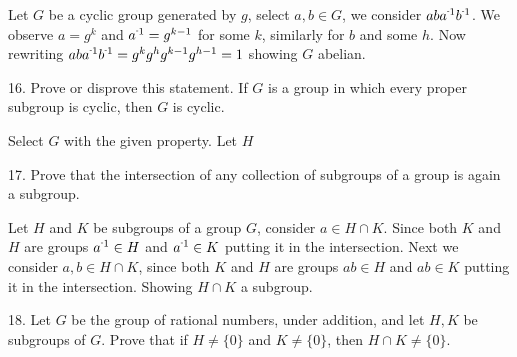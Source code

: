 \begin{mdframed}[style=darkAnswer,frametitle={Joe Starr}]
Let $G$ be a cyclic group generated by $g$, select $a,b\in G$, we consider
$ab\inv{a}\inv{b}$. We observe $a=g^k$ and $\inv{a}=g^{k-1}$ for some $k$,
similarly for $b$ and some $h$. Now rewriting
$ab\inv{a}\inv{b}=g^kg^hg^{k-1}g^{h-1}=1$ showing $G$ abelian.
\end{mdframed}
\newpage
\begin{mdframed}[style=darkQuesion]
16. Prove or disprove this statement. If $G$ is a group in which every proper subgroup is cyclic, then $G$ is cyclic.

\end{mdframed}

\begin{mdframed}[style=darkAnswer,frametitle={Joe Starr}]
Select $G$ with the given property. Let $H$

\end{mdframed}
\newpage
\begin{mdframed}[style=darkQuesion]
17. Prove that the intersection of any collection of subgroups of a group is again a subgroup.

\end{mdframed}

\begin{mdframed}[style=darkAnswer,frametitle={Joe Starr}]
Let $H$ and $K$ be subgroups of a group $G$, consider $a\in H\cap K$. Since
both $K$ and $H$ are groups $\inv{a} \in H$ and $\inv{a} \in K$ putting it in
the intersection. Next we consider $a,b\in H\cap K$, since
both $K$ and $H$ are groups $ab \in H$ and $ab \in K$ putting it in
the intersection. Showing $ H\cap K$ a subgroup.
\end{mdframed}
\newpage
\begin{mdframed}[style=darkQuesion]
18. Let $G$ be the group of rational numbers, under addition, and let $H, K$ be subgroups
of $G .$ Prove that if $H \neq\{0\}$ and $K \neq\{0\}$, then $H \cap K \neq\{0\}$.

\end{mdframed}

